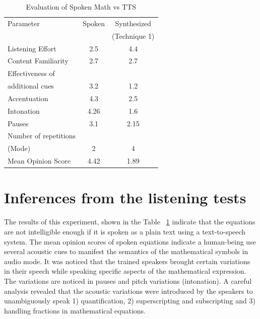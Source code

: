 \documentclass{article}
\begin{document}
\begin{table}[t]
\caption{\label{tts}Evaluation of Spoken Math vs TTS}

\vspace{8pt} %

\centering
\begin{tabular}{|l |c |c|}
\hline%
Parameter & Spoken & Synthesized  \\
                  &              & (Technique 1) \\[0.5ex]
\hline

Listening Effort & 2.5 & 4.4 \\
\hline
Content Familiarity &2.7 &2.7 \\
\hline
Effectiveness of & & \\
additional cues &3.2 &1.2 \\
\hline
Accentuation &4.3 &2.5 \\
\hline
Intonation & 4.26 & 1.6  \\
\hline
Pauses & 3.1 & 2.15 \\
\hline
Number of repetitions & & \\
(Mode) &2 & 4 \\
\hline
Mean Opinion Score & 4.42 & 1.89  \\%
\hline



\end{tabular}
\end{table}



\section{Inferences from the listening tests}
\label{sec:basis}
The results of this experiment, shown in the Table ~\ref{tts}   indicate that the equations are not intelligible enough if it is spoken as a plain text using a text-to-speech system. The mean opinion scores of spoken equations indicate a human-being use several acoustic cues to manifest the semantics of the mathematical symbols in audio mode. It was noticed that the trained speakers brought certain variations in their speech while speaking specific aspects of the mathematical expression. The variations are noticed in pauses and pitch variations (intonation). 
A careful analysis revealed that the acoustic variations were introduced by the speakers to unambiguously speak 1) quantification, 2) superscripting and subscripting and 3) handling fractions in mathematical equations. 
\end{document}
